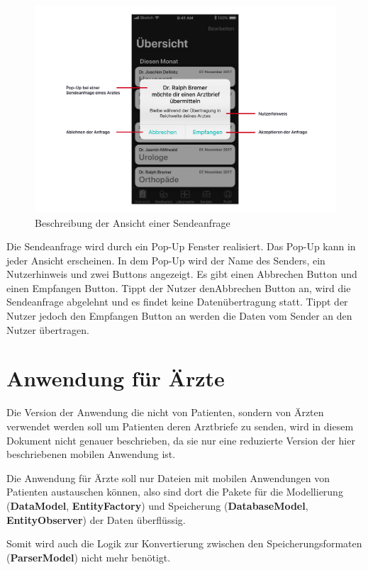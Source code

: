 \documentclass[a4paper]{scrreprt}
\begin{document}
\begin{figure}[H]
\centering
\includegraphics[width=1\textwidth]{graphics/UIDescriptions/PopUpDesc}
\caption{Beschreibung der Ansicht einer Sendeanfrage}
\vspace{0.5cm}
\end{figure}
Die Sendeanfrage wird durch ein Pop-Up Fenster realisiert. Das Pop-Up kann in jeder Ansicht erscheinen. In dem Pop-Up wird der Name des Senders, ein Nutzerhinweis und zwei Buttons angezeigt. Es gibt einen \dq Abbrechen\dq{} Button und einen \dq Empfangen\dq{} Button. Tippt der Nutzer den\dq Abbrechen\dq{} Button an, wird die Sendeanfrage abgelehnt und es findet keine Datenübertragung statt. Tippt der Nutzer jedoch den \dq Empfangen\dq{} Button an werden die Daten vom Sender an den Nutzer übertragen.


\chapter{Anwendung für Ärzte}
Die Version der Anwendung die nicht von Patienten, sondern von Ärzten verwendet werden soll um Patienten deren Arztbriefe zu senden, wird in diesem Dokument nicht genauer beschrieben, da sie nur eine reduzierte Version der hier beschriebenen mobilen Anwendung ist. 

Die Anwendung für Ärzte soll nur Dateien mit mobilen Anwendungen von Patienten austauschen können, also
sind dort die Pakete für die Modellierung (\textbf{DataModel}, \textbf{EntityFactory}) und Speicherung (\textbf{DatabaseModel}, \textbf{EntityObserver}) der Daten überflüssig. 

Somit wird auch die Logik zur Konvertierung zwischen den Speicherungsformaten (\textbf{ParserModel}) nicht mehr benötigt. 
\end{document}
